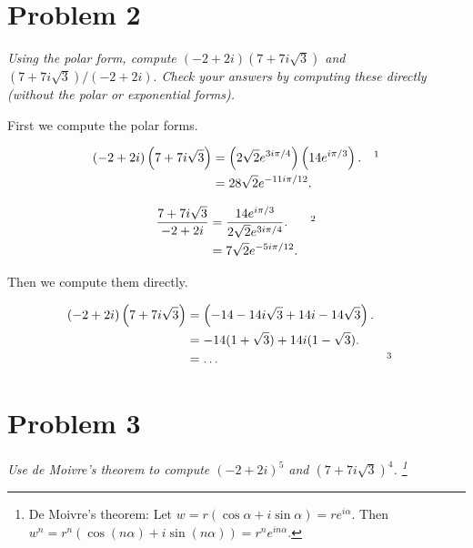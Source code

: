 \documentclass{tufte-handout}
\begin{document}
\section{Problem 2}
\begin{description}
\item \textit{Using the polar form, compute $(-2+2i)(7 + 7i\sqrt{3})$
    and $(7 + 7i\sqrt{3})/(-2 + 2i).$ Check your answers by computing
    these directly (without the polar or exponential forms).}
\end{description}

First we compute the polar forms.

\begin{align*}
  (-2 + 2i)\left(7 + 7i\sqrt 3\right) &= \left(2 \sqrt 2 e^{3i \pi /
                                        4}\right)\left(14e^{i\pi /
                                        3}\right). && \footnotemark \\
                                      &= 28 \sqrt 2 e^{-11i\pi / 12}.
\end{align*}

\begin{align*}
  {7 + 7i \sqrt 3 \over -2 + 2i} &= {14e^{i\pi / 3} \over 2 \sqrt 2
                                   e^{3i\pi / 4}}. && \footnotemark \\
                                 &= 7 \sqrt 2 e^{-5 i \pi / 12}.
\end{align*}

Then we compute them directly.

\begin{align*}
  (-2 + 2i)\left(7 + 7i\sqrt 3 \right) &= \left(-14 - 14 i \sqrt 3 + 14i
                                         -14 \sqrt 3\right).\\
                                       &= -14(1 + \sqrt 3) + 14i(1 -
                                         \sqrt 3).\\
                                       &= \ldots && \footnotemark
\end{align*}

\section{Problem 3}
\begin{description}
\item \textit{Use de Moivre's theorem to compute $(-2 + 2i)^5$ and
    $(7 + 7i\sqrt 3)^4$. \footnote{De Moivre's theorem: Let
      $w = r(\cos\alpha + i\sin\alpha) = re^{i\alpha}.$ Then
      $w^n = r^n(\cos(n\alpha) + i\sin(n\alpha)) = r^n
      e^{in\alpha}$.}}
\end{description}
\end{document}
